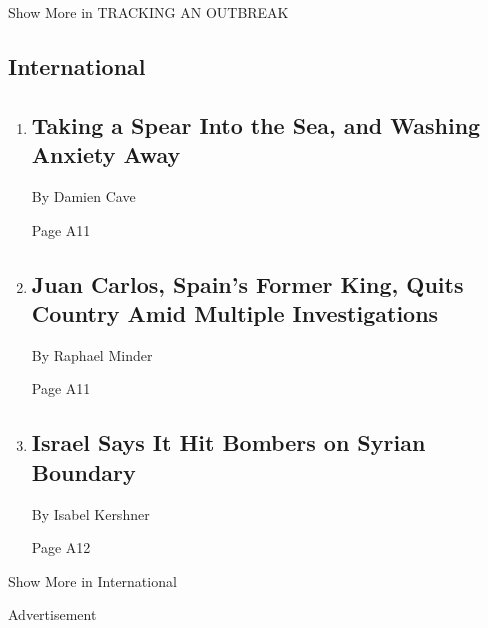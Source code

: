 Show More in TRACKING AN OUTBREAK

\hypertarget{international}{%
\subsection{International}\label{international}}

\begin{enumerate}
\def\labelenumi{\arabic{enumi}.}
\item
  \href{/2020/08/03/world/australia/spearfishing-sydney-coronavirus.html}{}

  \hypertarget{taking-a-spear-into-the-sea-and-washing-anxiety-away-1}{%
  \subsection{Taking a Spear Into the Sea, and Washing Anxiety
  Away}\label{taking-a-spear-into-the-sea-and-washing-anxiety-away-1}}

  By Damien Cave

  Page A11
\item
  \href{/2020/08/03/world/europe/juan-carlos-leaves-spain.html}{}

  \hypertarget{juan-carlos-spains-former-king-quits-country-amid-multiple-investigations}{%
  \subsection{Juan Carlos, Spain's Former King, Quits Country Amid
  Multiple
  Investigations}\label{juan-carlos-spains-former-king-quits-country-amid-multiple-investigations}}

  By Raphael Minder

  Page A11
\item
  \href{/2020/08/03/world/middleeast/israel-syria-border.html}{}

  \hypertarget{israel-says-it-hit-bombers-on-syrian-boundary}{%
  \subsection{Israel Says It Hit Bombers on Syrian
  Boundary}\label{israel-says-it-hit-bombers-on-syrian-boundary}}

  By Isabel Kershner

  Page A12
\end{enumerate}

Show More in International

Advertisement

